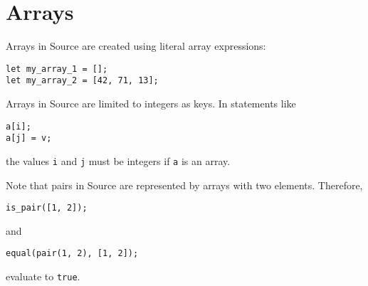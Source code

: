 \section*{Arrays}

Arrays in Source are created using literal array expressions:
\begin{lstlisting}
let my_array_1 = [];
let my_array_2 = [42, 71, 13];
\end{lstlisting}
Arrays in Source are limited to integers as keys.
In statements like
\begin{lstlisting}
a[i];
a[j] = v;
\end{lstlisting}
the values \lstinline{i} and \lstinline{j} must be integers if \lstinline{a} is an array.

Note that pairs in Source are represented by arrays with two elements. Therefore,
\begin{lstlisting}
is_pair([1, 2]);
\end{lstlisting}
and
\begin{lstlisting}
equal(pair(1, 2), [1, 2]);
\end{lstlisting}
evaluate to \texttt{true}.
